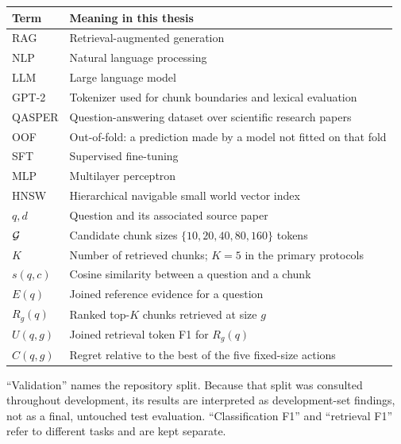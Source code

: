 \begin{tabularx}{\textwidth}{@{}lX@{}}
\toprule
Term & Meaning in this thesis\\
\midrule
RAG & Retrieval-augmented generation\\
NLP & Natural language processing\\
LLM & Large language model\\
GPT-2 & Tokenizer used for chunk boundaries and lexical evaluation\\
QASPER & Question-answering dataset over scientific research papers\\
OOF & Out-of-fold: a prediction made by a model not fitted on that fold\\
SFT & Supervised fine-tuning\\
MLP & Multilayer perceptron\\
HNSW & Hierarchical navigable small world vector index\\
$q,d$ & Question and its associated source paper\\
$\mathcal{G}$ & Candidate chunk sizes $\{10,20,40,80,160\}$ tokens\\
$K$ & Number of retrieved chunks; $K=5$ in the primary protocols\\
$s(q,c)$ & Cosine similarity between a question and a chunk\\
$E(q)$ & Joined reference evidence for a question\\
$R_g(q)$ & Ranked top-$K$ chunks retrieved at size $g$\\
$U(q,g)$ & Joined retrieval token F1 for $R_g(q)$\\
$C(q,g)$ & Regret relative to the best of the five fixed-size actions\\
\bottomrule
\end{tabularx}

\medskip
\enquote{Validation} names the repository split. Because that split was consulted
throughout development, its results are interpreted as development-set
findings, not as a final, untouched test evaluation. \enquote{Classification F1}
and \enquote{retrieval F1} refer to different tasks and are kept separate.
